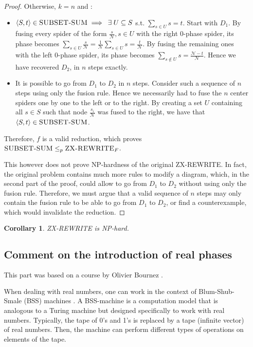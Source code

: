 \documentclass[journal,onecolumn]{IEEEtran}
\newtheorem{corollary}{Corollary}
\begin{document}
\begin{proof}
Otherwise, $k = n$ and :
\begin{itemize}
	\item[($\Rightarrow$)] $\left< S, t \right> \in \textsc{SUBSET-SUM} \implies \; \exists \; U \subseteq S$ s.t. $ \sum_{s \in U} s = t$. Start with $D_1$. By fusing every spider of the form $\frac{s}{\mathcal{N}}, s \in U$ with the right 0-phase spider, its phase becomes $\sum_{s \in U} \frac{s}{\mathcal{N}} = \frac{1}{\mathcal{N}} \sum_{s \in U} s = \frac{t}{\mathcal{N}}$. By fusing the remaining ones with the left 0-phase spider, its phase becomes $\sum_{s \notin U} s = \frac{\mathcal{N} - t}{\mathcal{N}}$. Hence we have recovered $D_2$, in $n$ steps exactly.
	\item[($\Leftarrow$)] It is possible to go from $D_1$ to $D_2$ in $n$ steps. Consider such a sequence of $n$ steps using only the fusion rule. Hence we necessarily had to fuse the $n$ center spiders one by one to the left or to the right. By creating a set $U$ containing all  $s \in S$ such that node $\frac{s_i}{\mathcal{N}}$ was fused to the right, we have that $\left< S, t \right> \in \textsc{SUBSET-SUM}$.
\end{itemize}


Therefore, $f$ is a valid reduction, which proves $\textsc{SUBSET-SUM} \leq_p \textsc{ZX-REWRITE}_F$.

This however does not prove \textsc{NP}-hardness of the original \textsc{ZX-REWRITE}. In fact, the original problem contains much more rules to modify a diagram, which, in the second part of the proof, could allow to go from $D_1$ to $D_2$ without using only the fusion rule. Therefore, we must argue that a valid sequence of $n$ steps may only contain the fusion rule to be able to go from $D_1$ to $D_2$, or find a counterexample, which would invalidate the reduction.

\end{proof}

\begin{corollary}
	\textsc{ZX-REWRITE} is \textsc {NP}-hard.
	
\end{corollary}

\subsection{Comment on the introduction of real phases}

This part was based on a course by Olivier Bournez \cite{bournez2013bss}.

When dealing with real numbers, one can work in the context of Blum-Shub-Smale (BSS) machines \cite{wiki:bss_machine}. A BSS-machine is a computation model that is analogous to a Turing machine but designed specifically to work with real numbers. Typically, the tape of 0's and 1's is replaced by a tape (infinite vector) of real numbers. Then, the machine can perform different types of operations on elements of the tape.
\end{document}
